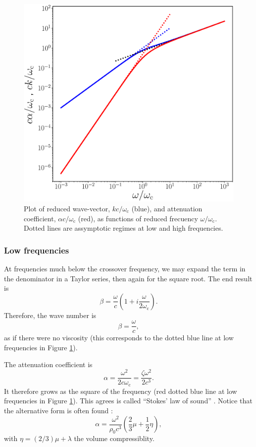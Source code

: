 \begin{figure}
  \centering
  \begin{minipage}{0.7\textwidth}
      \includegraphics[width=\textwidth]{figures/sound_wave_att}
  \end{minipage}
  \caption{Plot of reduced wave-vector, $k c /\omega_\mathrm{c}$ (blue), and
    attenuation coefficient, $\alpha c /\omega_\mathrm{c}$ (red), as functions
    of reduced frecuency $\omega /\omega_\mathrm{c}$. Dotted lines are
    assymptotic regimes at low and high frequencies.
    \label{fig:sound_wave_att}}
\end{figure}


\subsubsection{Low frequencies}


At frequencies much below the crossover frequency, we may expand the
term in the denominator in a Taylor series, then again for the square
root. The end result is
\[
\beta = \frac{\omega}{c} \left(1 + i   \frac{\omega}{2 \omega_\mathrm{c}}\right).
\]
%
Therefore, the wave number is
\[
\beta = \frac{\omega}{c},
\]
as if there were no viscosity (this corresponds to the dotted blue
line at low frequencies in Figure \ref{fig:sound_wave_att}).

The attenuation coefficient is
\[ \alpha = \frac{\omega^2}{2 c\omega_\mathrm{c}}=
\frac{ \zeta \omega^2 }{2 c^3}. \]
%
It therefore grows as the square of the frequency (red dotted blue
line at low frequencies in Figure \ref{fig:sound_wave_att}).  This
agrees is called ``Stokes' law of sound'' . Notice that the alternative form is often found
\cite{wiki:SLoSA}:
\[
  \alpha =  \frac{\omega^2}{\rho_0 c^3}
  \left( \frac23 \mu+ \frac12 \eta  \right),
\]
with $\eta= (2/3) \mu + \lambda$ the volume compressiblity.

